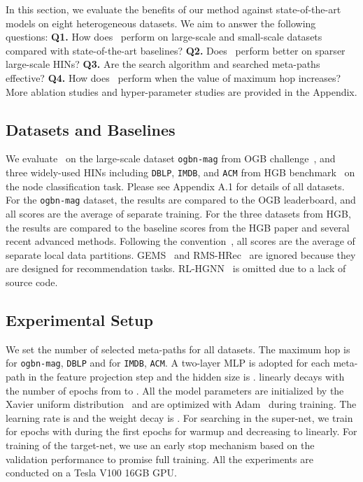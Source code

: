 In this section, we evaluate the benefits of our method against state-of-the-art models on eight heterogeneous datasets. We aim to answer the following questions:  
\textbf{Q1.} How does \model~perform on large-scale and small-scale datasets compared with state-of-the-art baselines? 
\textbf{Q2.} Does \model~perform better on sparser large-scale HINs? 
\textbf{Q3.} Are the search algorithm and searched meta-paths effective? 
\textbf{Q4.} How does \model~perform when the value of maximum hop increases? 
More ablation studies and hyper-parameter studies are provided in the Appendix.

\subsection{Datasets and Baselines}
We evaluate \model~on the large-scale dataset \texttt{ogbn-mag} from OGB challenge~\citep{hu2021ogb}, and three widely-used HINs including \texttt{DBLP}, \texttt{IMDB}, and \texttt{ACM} from HGB benchmark~\citep{lv2021we} on the node classification task. Please see Appendix A.1 for details of all datasets.
For the \texttt{ogbn-mag} dataset, the results are compared to the OGB leaderboard, and all scores are the average of  separate training. For the three datasets from HGB, the results are compared to the baseline scores from the HGB paper and several recent advanced methods. 
Following the convention~\citep{lv2021we,yang2022simple}, all scores are the average of  separate local data partitions. GEMS~\citep{han2020genetic} and RMS-HRec~\citep{ning2022automatic} are ignored because they are designed for recommendation tasks. 
RL-HGNN~\citep{zhong2020reinforcement} is omitted due to a lack of source code. 





\subsection{Experimental Setup}
We set the number of selected meta-paths  for all datasets. The maximum hop is  for \texttt{ogbn-mag}, \texttt{DBLP} and  for \texttt{IMDB}, \texttt{ACM}. A two-layer MLP is adopted for each meta-path in the feature projection step and the hidden size is .  linearly decays with the number of epochs from  to . All the model parameters are initialized by the Xavier uniform distribution~\citep{DBLP:journals/jmlr/GlorotB10} and are optimized with Adam~\citep{adam} during training.  
The learning rate is  and the weight decay is . For searching in the super-net, we train for  epochs with  during the first  epochs for warmup and decreasing to  linearly. 
For training of the target-net, we use an early stop mechanism based on the validation performance to promise full training. All the experiments are conducted on a Tesla V100 16GB GPU. 





